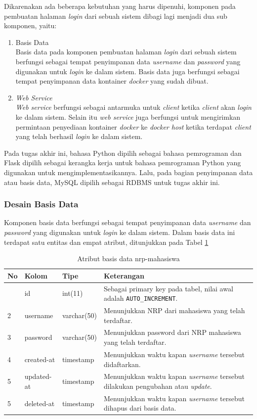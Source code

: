 Dikarenakan ada beberapa kebutuhan yang harus dipenuhi, komponen pada pembuatan halaman \textit{login} dari sebuah sistem dibagi lagi menjadi dua sub komponen, yaitu:
\begin{enumerate}
	\item Basis Data \\
	Basis data pada komponen pembuatan halaman \textit{login} dari sebuah sistem berfungsi sebagai tempat penyimpanan data \textit{username} dan \textit{password} yang digunakan untuk \textit{login} ke dalam sistem. Basis data juga berfungsi sebagai tempat penyimpanan data kontainer \textit{docker} yang sudah dibuat.
	\item \textit{Web Service} \\
	\textit{Web service} berfungsi sebagai antarmuka untuk \textit{client} ketika \textit{client} akan \textit{login} ke dalam sistem. Selain itu \textit{web service} juga berfungsi untuk mengirimkan permintaan penyediaan kontainer \textit{docker} ke \textit{docker host} ketika terdapat \textit{client} yang telah berhasil \textit{login} ke dalam sistem.
\end{enumerate}

Pada tugas akhir ini, bahasa Python dipilih sebagai bahasa pemrograman dan Flask dipilih sebagai kerangka kerja untuk bahasa pemrograman Python yang digunakan untuk mengimplementasikannya. Lalu, pada bagian penyimpanan data atau basis data, MySQL dipilih sebagai RDBMS untuk tugas akhir ini.

\subsubsection{Desain Basis Data}
Komponen basis data berfungsi sebagai tempat penyimpanan data \textit{username} dan \textit{password} yang digunakan untuk \textit{login} ke dalam sistem. Dalam basis data ini terdapat satu entitas dan empat atribut, ditunjukkan pada Tabel \ref{tabelnrpmahasiswa}
\begin{longtable}{|p{}|p{}|p{}|p{}|}
	\caption{Atribut basis data nrp-mahasiswa} \label{tabelnrpmahasiswa} \\
	\hline
	\textbf{No} & \textbf{Kolom} & \textbf{Tipe} & \textbf{Keterangan} \\ \hline
	\endhead
	\endfoot
	\endlastfoot
	1 & id & int(11) & Sebagai primary key pada tabel, nilai awal adalah \texttt{AUTO\_INCREMENT}. \\ \hline
	2 & username & varchar(50) & Menunjukkan NRP dari mahasiswa yang telah terdaftar. \\ \hline
	3 & password & varchar(50) & Menunjukkan password dari NRP mahasiswa yang telah terdaftar. \\ \hline
	4 & created-at & timestamp & Menunjukkan waktu kapan \textit{username} tersebut didaftarkan. \\ \hline
	5 & updated-at & timestamp & Menunjukkan waktu kapan \textit{username} tersebut dilakukan pengubahan atau \textit{update}. \\ \hline
	5 & deleted-at & timestamp & Menunjukkan waktu kapan \textit{username} tersebut dihapus dari basis data. \\ \hline
\end{longtable}
